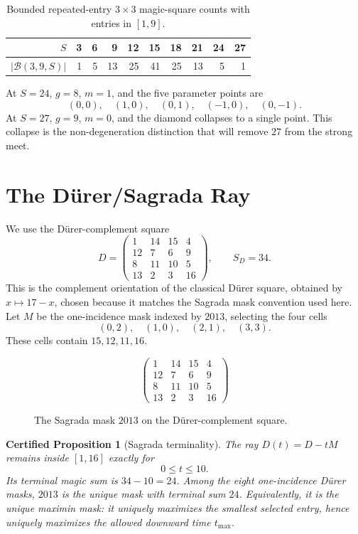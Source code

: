\documentclass[11pt,a4paper]{article}
\newtheorem{certprop}[theorem]{Certified Proposition}
\theoremstyle{definition}
\theoremstyle{remark}
\newcommand{\B}{\mathcal B}
\newcommand{\Durer}{D\"urer\xspace}
\begin{document}
\begin{table}[htbp]
\centering
\begin{tabular}{rrrrrrrrrr}
\toprule
\(S\) & 3 & 6 & 9 & 12 & 15 & 18 & 21 & 24 & 27\\
\midrule
\(|\B(3,9,S)|\) & 1 & 5 & 13 & 25 & 41 & 25 & 13 & 5 & 1\\
\bottomrule
\end{tabular}
\caption{Bounded repeated-entry \(3\times3\) magic-square counts with entries
in \([1,9]\).}
\label{tab:loshu-counts}
\end{table}

At \(S=24\), \(g=8\), \(m=1\), and the five parameter points are
\[
(0,0),\quad (1,0),\quad (0,1),\quad (-1,0),\quad (0,-1).
\]
At \(S=27\), \(g=9\), \(m=0\), and the diamond collapses to a single point.
This collapse is the non-degeneration distinction that will remove \(27\)
from the strong meet.

\section{The \Durer/Sagrada Ray}
\label{sec:durer-ray}

We use the \Durer-complement square
\[
D=
\begin{pmatrix}
1&14&15&4\\
12&7&6&9\\
8&11&10&5\\
13&2&3&16
\end{pmatrix},
\qquad S_D=34.
\]
This is the complement orientation of the classical \Durer square, obtained
by \(x\mapsto17-x\), chosen because it matches the Sagrada mask convention
used here.
Let \(M\) be the one-incidence mask indexed by \(2013\), selecting the four
cells
\[
(0,2),\quad (1,0),\quad (2,1),\quad (3,3).
\]
These cells contain \(15,12,11,16\).

\begin{figure}[htbp]
\centering
\[
\begin{pmatrix}
1&14&\boxed{15}&4\\
\boxed{12}&7&6&9\\
8&\boxed{11}&10&5\\
13&2&3&\boxed{16}
\end{pmatrix}
\]
\caption{The Sagrada mask \(2013\) on the \Durer-complement square.}
\label{fig:sagrada-mask}
\end{figure}

\begin{certprop}[Sagrada terminality]
\label{prop:sagrada-terminal}
The ray \(D(t)=D-tM\) remains inside \([1,16]\) exactly for
\[
0\le t\le 10.
\]
Its terminal magic sum is \(34-10=24\).  Among the eight one-incidence \Durer
masks, \(2013\) is the unique mask with terminal sum \(24\).  Equivalently,
it is the unique maximin mask: it uniquely maximizes the smallest selected
entry, hence uniquely maximizes the allowed downward time \(t_{\max}\).
\end{certprop}
\end{document}
